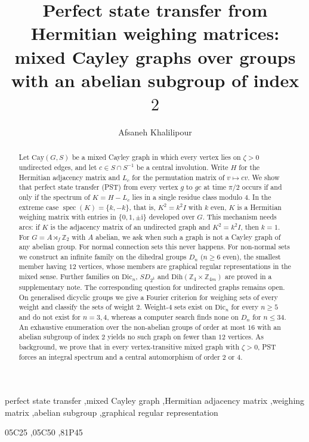\documentclass[preprint,11pt]{elsarticle}
\theoremstyle{definition}
\theoremstyle{remark}
\begin{document}
\begin{frontmatter}

\title{Perfect state transfer from Hermitian weighing matrices: mixed Cayley graphs over groups with an abelian subgroup of index $2$}

\author{Afsaneh Khalilipour}

\address{Department of Mathematics, Faculty of Science, Shahid Rajaee Teacher Training University, Tehran, 16785-163, I. R. Iran}

\begin{abstract}
Let $\mathrm{Cay}(G,S)$ be a mixed Cayley graph in which every vertex lies on $\zeta>0$ undirected edges, and let $c\in S\cap S^{-1}$ be a central involution. Write $H$ for the Hermitian adjacency matrix and $L_c$ for the permutation matrix of $v\mapsto cv$. We show that perfect state transfer (PST) from every vertex $g$ to $gc$ at time $\pi/2$ occurs if and only if the spectrum of $K=H-L_c$ lies in a single residue class modulo $4$. In the extreme case $\operatorname{spec}(K)=\{k,-k\}$, that is, $K^2=k^2I$ with $k$ even, $K$ is a Hermitian weighing matrix with entries in $\{0,1,\pm\mathrm i\}$ developed over $G$. This mechanism needs arcs: if $K$ is the adjacency matrix of an undirected graph and $K^2=k^2I$, then $k=1$. For $G=A\rtimes_f\mathbb Z_2$ with $A$ abelian, we ask when such a graph is not a Cayley graph of any abelian group. For normal connection sets this never happens. For non-normal sets we construct an infinite family on the dihedral groups $D_n$ ($n\ge6$ even), the smallest member having $12$ vertices, whose members are graphical regular representations in the mixed sense. Further families on $\mathrm{Dic}_n$, $SD_{2^k}$ and $\mathrm{Dih}(\mathbb Z_4\times\mathbb Z_{4m})$ are proved in a supplementary note. The corresponding question for undirected graphs remains open. On generalised dicyclic groups we give a Fourier criterion for weighing sets of every weight and classify the sets of weight $2$. Weight-$4$ sets exist on $\mathrm{Dic}_n$ for every $n\ge5$ and do not exist for $n=3,4$, whereas a computer search finds none on $D_n$ for $n\le34$. An exhaustive enumeration over the non-abelian groups of order at most $16$ with an abelian subgroup of index $2$ yields no such graph on fewer than $12$ vertices. As background, we prove that in every vertex-transitive mixed graph with $\zeta>0$, PST forces an integral spectrum and a central automorphism of order $2$ or $4$.
\end{abstract}

\begin{keyword}
perfect state transfer \sep mixed Cayley graph \sep Hermitian adjacency matrix \sep weighing matrix \sep abelian subgroup \sep graphical regular representation

\MSC[2020] 05C25 \sep 05C50 \sep 81P45
\end{keyword}

\end{frontmatter}
\end{document}
